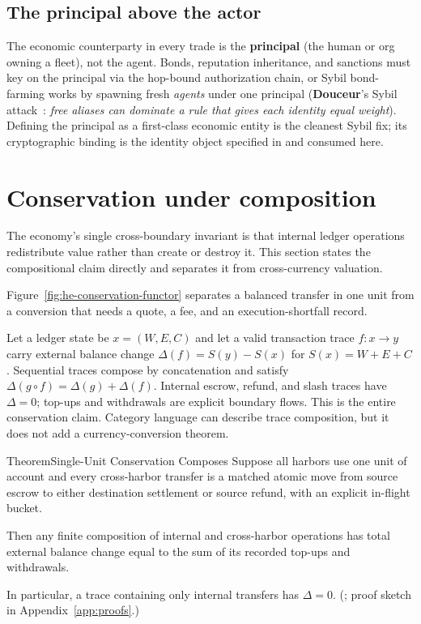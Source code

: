 \documentclass[11pt,a4paper]{article}
\theoremstyle{definition}
\theoremstyle{definition}
\theoremstyle{remark}
\begin{document}
\subsection{The principal above the actor}

The economic counterparty in every trade is the \textbf{principal} (the human or
org owning a fleet), not the agent. Bonds, reputation inheritance, and sanctions
must key on the principal via the hop-bound authorization chain, or Sybil
bond-farming works by spawning fresh \emph{agents} under one principal
(\textbf{Douceur}'s Sybil attack~: \emph{free aliases can dominate a rule that gives each identity equal weight}). Defining the principal as a first-class economic
entity is the cleanest Sybil fix; its cryptographic binding is the identity object
specified in  and consumed here.




\section{Conservation under composition}\label{sec:conservation}

The economy's single cross-boundary invariant is that internal ledger operations
redistribute value rather than create or destroy it. This section states the
compositional claim directly and separates it from cross-currency valuation.

Figure~\ref{fig:he-conservation-functor} separates a balanced transfer in one
unit from a conversion that needs a quote, a fee, and an execution-shortfall record.



Let a ledger state be $x=(W,E,C)$ and let a valid transaction trace $f:x\to y$
carry external balance change $\Delta(f)=S(y)-S(x)$ for $S(x)=W+E+C$.
Sequential traces compose by concatenation and satisfy
$\Delta(g\circ f)=\Delta(g)+\Delta(f)$. Internal escrow, refund, and slash traces
have $\Delta=0$; top-ups and withdrawals are explicit boundary flows. This is the
entire conservation claim. Category language can describe trace composition, but
it does not add a currency-conversion theorem.

\begin{pdclaim}{Theorem}{Single-Unit Conservation Composes}
\setlength{\parskip}{4pt plus 1pt}
\label{thm:functor}
Suppose all harbors use one unit of account and every cross-harbor transfer is a
matched atomic move from source escrow to either destination settlement or source
refund, with an explicit in-flight bucket. 

Then any finite composition of internal
and cross-harbor operations has total external balance change equal to the sum of
its recorded top-ups and withdrawals. 

In particular, a trace containing only
internal transfers has $\Delta=0$. (\Designed{}; proof sketch in
Appendix~\ref{app:proofs}.)
\end{pdclaim}
\end{document}
